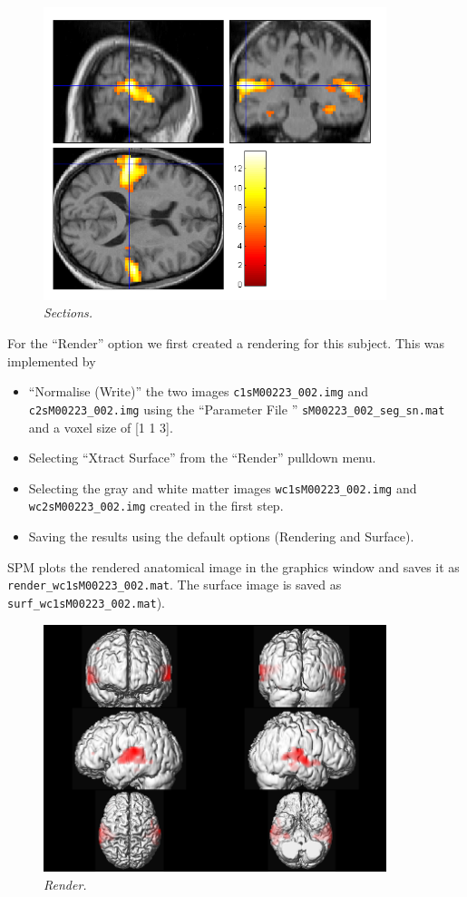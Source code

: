 \begin{figure}
\begin{center}
\includegraphics[width=100mm]{auditory/sections}
\caption{\emph{Sections.} \label{aud_sections} }
\end{center}
\end{figure}

For the ``Render'' option we first created a rendering for this subject. This was implemented by 

\begin{itemize}
\item ``Normalise (Write)'' the two images \texttt{c1sM00223\_002.img} and \texttt{c2sM00223\_002.img} using the ``Parameter File '' \texttt{sM00223\_002\_seg\_sn.mat} and a voxel size of [1 1 3].
\item Selecting ``Xtract Surface'' from the ``Render'' pulldown menu.
\item Selecting the gray and white matter images \texttt{wc1sM00223\_002.img} and \texttt{wc2sM00223\_002.img} created in the first step.
\item Saving the results using the default options (Rendering and Surface).
\end{itemize}

SPM plots the rendered anatomical image in the graphics window and saves it as \texttt{render\_wc1sM00223\_002.mat}. The surface image is saved as \texttt{surf\_wc1sM00223\_002.mat}).

\begin{figure}
\begin{center}
\includegraphics[width=100mm]{auditory/render}
\caption{\emph{Render.} \label{aud_render} }
\end{center}
\end{figure}

